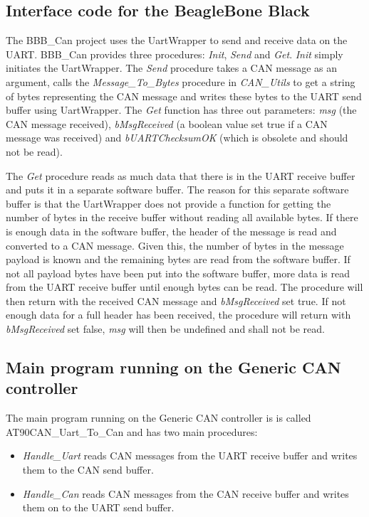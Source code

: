 \subsection{Interface code for the BeagleBone Black}
The BBB\_Can project uses the UartWrapper to send and receive data on the UART. BBB\_Can provides three procedures: \emph{Init}, \emph{Send} and \emph{Get}. \newline
\emph{Init} simply initiates the UartWrapper. \newline
The \emph{Send} procedure takes a CAN message as an argument, calls the \emph{Message\_To\_Bytes} procedure in \emph{CAN\_Utils} to get a string of bytes representing the CAN message and writes these bytes to the UART send buffer using UartWrapper. \newline
The \emph{Get} function has three out parameters: \emph{msg} (the CAN message received), \emph{bMsgReceived} (a boolean value set true if a CAN message was received) and \emph{bUARTChecksumOK} (which is obsolete and should not be read). 

The \emph{Get} procedure reads as much data that there is in the UART receive buffer and puts it in a separate software buffer. The reason for this separate software buffer is that the UartWrapper does not provide a function for getting the number of bytes in the receive buffer without reading all available bytes. \newline
If there is enough data in the software buffer, the header of the message is read and converted to a CAN message. Given this, the number of bytes in the message payload is known and the remaining bytes are read from the software buffer. If not all payload bytes have been put into the software buffer, more data is read from the UART receive buffer until enough bytes can be read. The procedure will then return with the received CAN message and \emph{bMsgReceived} set true. \newline
If not enough data for a full header has been received, the procedure will return with \emph{bMsgReceived} set false, \emph{msg} will then be undefined and shall not be read.


\subsection{Main program running on the Generic CAN controller}
The main program running on the Generic CAN controller is is called AT90CAN\_Uart\_To\_Can and has two main procedures:

\begin{itemize}
   \item { \em Handle\_Uart}
   reads CAN messages from the UART receive buffer and writes them to the CAN send buffer.
   \item { \em Handle\_Can}
   reads CAN messages from the CAN receive buffer and writes them on to the UART send buffer.
\end{itemize}

